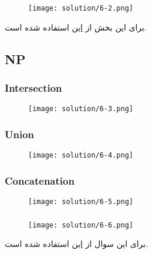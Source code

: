\subsubsection*{}
\begin{figure}[H]
    \centering
    \texttt{[image: solution/6-2.png]}
\end{figure}

برای این بخش از 
\href{https://www.cs.umd.edu/~gasarch/COURSES/452/F14/poly.pdf}{این}
استفاده شده است.


\subsection*{NP}


\subsubsection*{Intersection}
\begin{figure}[H]
    \centering
    \texttt{[image: solution/6-3.png]}
\end{figure}

\subsubsection*{Union}
\begin{figure}[H]
    \centering
    \texttt{[image: solution/6-4.png]}
\end{figure}

\subsubsection*{Concatenation}
\begin{figure}[H]
    \centering
    \texttt{[image: solution/6-5.png]}
\end{figure}

\subsubsection*{}
\begin{figure}[H]
    \centering
    \texttt{[image: solution/6-6.png]}
\end{figure}


برای این سوال از 
\href{https://homes.cs.aau.dk/~srba/courses/tutorials-CC-10/t13-sol.pdf}{این}
استفاده شده است.
\\